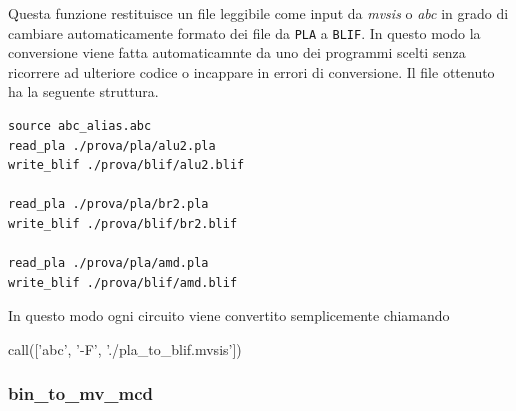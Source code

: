 \documentclass[italian,]{book}
\newenvironment{Shaded}{\begin{snugshade}}{\end{snugshade}}
\newcommand{\NormalTok}[1]{#1}
\newcommand{\StringTok}[1]{\textcolor[rgb]{0.31,0.60,0.02}{#1}}
\begin{document}
Questa funzione restituisce un file leggibile come input da \emph{mvsis} o \emph{abc} in grado di cambiare automaticamente formato dei file da \texttt{PLA} a \texttt{BLIF}. In questo modo la conversione viene fatta automaticamnte da uno dei programmi scelti senza ricorrere ad ulteriore codice o incappare in errori di conversione. Il file ottenuto ha la seguente struttura.

\begin{verbatim}
source abc_alias.abc
read_pla ./prova/pla/alu2.pla
write_blif ./prova/blif/alu2.blif

read_pla ./prova/pla/br2.pla
write_blif ./prova/blif/br2.blif

read_pla ./prova/pla/amd.pla
write_blif ./prova/blif/amd.blif
\end{verbatim}

In questo modo ogni circuito viene convertito semplicemente chiamando

\begin{Shaded}
\begin{Highlighting}[]
\NormalTok{call([}\StringTok{'abc'}\NormalTok{, }\StringTok{'-F'}\NormalTok{, }\StringTok{'./pla_to_blif.mvsis'}\NormalTok{])}
\end{Highlighting}
\end{Shaded}

\newpage

\hypertarget{bin_to_mv_mcd}{%
\subsubsection{bin\_to\_mv\_mcd}\label{bin_to_mv_mcd}}
\end{document}
